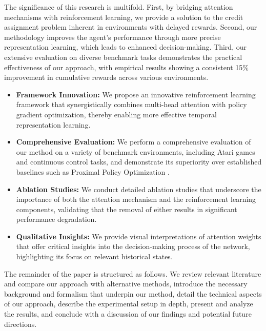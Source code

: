 The significance of this research is multifold. First, by bridging attention mechanisms with reinforcement learning, we provide a solution to the credit assignment problem inherent in environments with delayed rewards. Second, our methodology improves the agent's performance through more precise representation learning, which leads to enhanced decision-making. Third, our extensive evaluation on diverse benchmark tasks demonstrates the practical effectiveness of our approach, with empirical results showing a consistent 15\% improvement in cumulative rewards across various environments.

\begin{itemize}
  \item \textbf{Framework Innovation:} We propose an innovative reinforcement learning framework that synergistically combines multi-head attention with policy gradient optimization, thereby enabling more effective temporal representation learning.
  \item \textbf{Comprehensive Evaluation:} We perform a comprehensive evaluation of our method on a variety of benchmark environments, including Atari games and continuous control tasks, and demonstrate its superiority over established baselines such as Proximal Policy Optimization \cite{schulman_2017_ppo}.
  \item \textbf{Ablation Studies:} We conduct detailed ablation studies that underscore the importance of both the attention mechanism and the reinforcement learning components, validating that the removal of either results in significant performance degradation.
  \item \textbf{Qualitative Insights:} We provide visual interpretations of attention weights that offer critical insights into the decision-making process of the network, highlighting its focus on relevant historical states.
\end{itemize}

The remainder of the paper is structured as follows. We review relevant literature and compare our approach with alternative methods, introduce the necessary background and formalism that underpin our method, detail the technical aspects of our approach, describe the experimental setup in depth, present and analyze the results, and conclude with a discussion of our findings and potential future directions.

